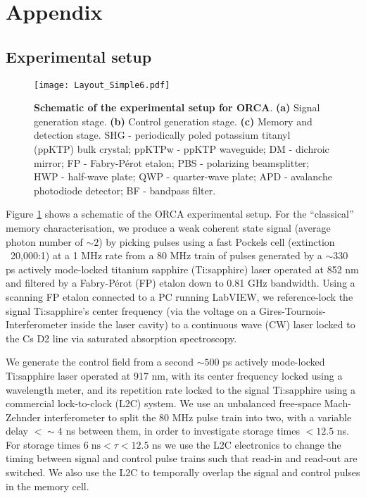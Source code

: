 \documentclass[%
 reprint,
 amsmath,amssymb,
 aps,
 pra,
]{revtex4-1}
\begin{document}
\onecolumngrid
\section*{Appendix}
\setcounter{figure}{0}
\renewcommand{\thefigure}{A.\arabic{figure}}
\setcounter{table}{0}
\renewcommand{\thetable}{A.\arabic{table}}
\setcounter{subsection}{0}
\renewcommand{\thesubsection}{A.\arabic{subsection}}
\setcounter{equation}{0}
\renewcommand{\theequation}{A.\arabic{equation}}

\subsection{Experimental setup \label{setup}}

\begin{figure}[h!]
\texttt{[image: Layout\_Simple6.pdf]} 
\caption{\textbf{Schematic of the experimental setup for ORCA}. \textbf{(a) }  Signal generation stage. \textbf{(b) } Control generation stage. \textbf{(c) } Memory and detection stage. SHG - periodically poled potassium titanyl (ppKTP) bulk crystal; ppKTPw - ppKTP waveguide; DM - dichroic mirror; FP - Fabry-P\'erot etalon; PBS - polarizing beamsplitter; HWP - half-wave plate; QWP - quarter-wave plate; APD - avalanche photodiode detector; BF - bandpass filter.}\label{fig:figSup1}
\end{figure}

Figure \ref{fig:figSup1} shows a schematic of the ORCA experimental setup. For the ``classical'' memory characterisation, we produce a weak coherent state signal (average photon number of $\sim2$) by picking pulses using a fast Pockels cell (extinction ~20,000:1) at a 1 MHz rate from a 80 MHz train of pulses generated by a $\sim330$ ps actively mode-locked titanium sapphire (Ti:sapphire) laser operated at 852 nm and filtered by a Fabry-P\'erot (FP) etalon down to 0.81 GHz bandwidth. Using a scanning FP etalon connected to a PC running LabVIEW, we reference-lock the signal Ti:sapphire's center frequency (via the voltage on a Gires-Tournois-Interferometer inside the laser cavity) to a continuous wave (CW) laser locked to the Cs D2 line via saturated absorption spectroscopy. 

We generate the control field from a second $\sim500$ ps actively mode-locked Ti:sapphire laser operated at 917 nm, with its center frequency locked using a wavelength meter, and its repetition rate locked to the signal Ti:sapphire using a commercial lock-to-clock (L2C) system. We use an unbalanced free-space Mach-Zehnder interferometer to split the 80 MHz pulse train into two, with a variable delay $<\sim4$ ns between them, in order to investigate storage times $<12.5$ ns. For storage times $6\;\mathrm{ns}<\tau<12.5$ ns we use the L2C electronics to change the timing between signal and control pulse trains such that read-in and read-out are switched. We also use the L2C to temporally overlap the signal and control pulses in the memory cell.
\end{document}
